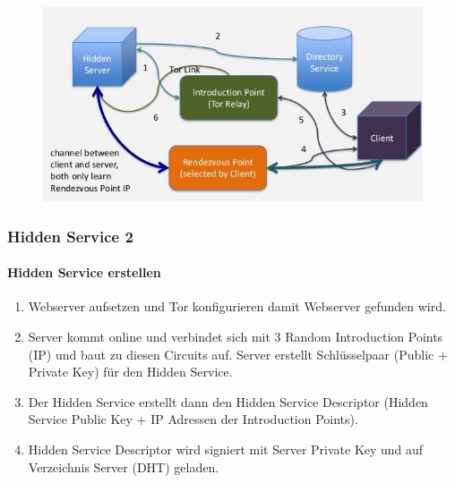 \begin{figure}[h]
\centering
\includegraphics[width=0.57\linewidth]{images/hiddenservice}
\label{fig:hiddenservice}
\end{figure}

\newpage


\subsubsection{Hidden Service 2}
\paragraph{Hidden Service erstellen}
\begin{enumerate}
    \item Webserver aufsetzen und Tor konfigurieren damit Webserver gefunden wird.
    \item Server kommt online und verbindet sich mit 3 Random Introduction Points (IP) und baut zu diesen Circuits auf. Server erstellt Schlüsselpaar (Public + Private Key) für den Hidden Service.
    \item Der Hidden Service erstellt dann den Hidden Service Descriptor (Hidden Service Public Key + IP Adressen der Introduction Points). 
    \item Hidden Service Descriptor wird signiert mit Server Private Key und auf Verzeichnis Server (DHT) geladen.
\end{enumerate}

